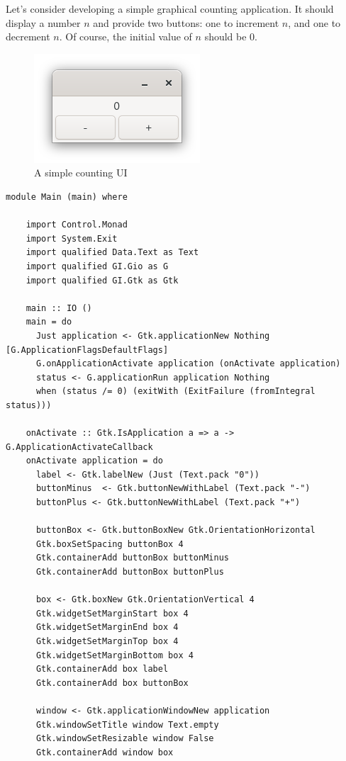 \documentclass[UdineBachThesis,american,11pt]{PhdThesis}
\begin{document}
  Let's consider developing a simple graphical counting application. It should
  display a number $n$ and provide two buttons: one to increment $n$, and one to
  decrement $n$. Of course, the initial value of $n$ should be $0$.

  \newpage

  \begin{figure}[h]
    \centering
    \includegraphics[scale=0.8]{7.png}
    \caption{A simple counting UI}
  \end{figure}

  \begin{lstlisting}[gobble=4,basicstyle=\ttfamily\small]
    module Main (main) where

    import Control.Monad
    import System.Exit
    import qualified Data.Text as Text
    import qualified GI.Gio as G
    import qualified GI.Gtk as Gtk

    main :: IO ()
    main = do
      Just application <- Gtk.applicationNew Nothing [G.ApplicationFlagsDefaultFlags]
      G.onApplicationActivate application (onActivate application)
      status <- G.applicationRun application Nothing
      when (status /= 0) (exitWith (ExitFailure (fromIntegral status)))

    onActivate :: Gtk.IsApplication a => a -> G.ApplicationActivateCallback
    onActivate application = do
      label <- Gtk.labelNew (Just (Text.pack "0"))
      buttonMinus  <- Gtk.buttonNewWithLabel (Text.pack "-")
      buttonPlus <- Gtk.buttonNewWithLabel (Text.pack "+")

      buttonBox <- Gtk.buttonBoxNew Gtk.OrientationHorizontal
      Gtk.boxSetSpacing buttonBox 4
      Gtk.containerAdd buttonBox buttonMinus
      Gtk.containerAdd buttonBox buttonPlus

      box <- Gtk.boxNew Gtk.OrientationVertical 4
      Gtk.widgetSetMarginStart box 4
      Gtk.widgetSetMarginEnd box 4
      Gtk.widgetSetMarginTop box 4
      Gtk.widgetSetMarginBottom box 4
      Gtk.containerAdd box label
      Gtk.containerAdd box buttonBox

      window <- Gtk.applicationWindowNew application
      Gtk.windowSetTitle window Text.empty
      Gtk.windowSetResizable window False
      Gtk.containerAdd window box
  \end{lstlisting}
\end{document}
